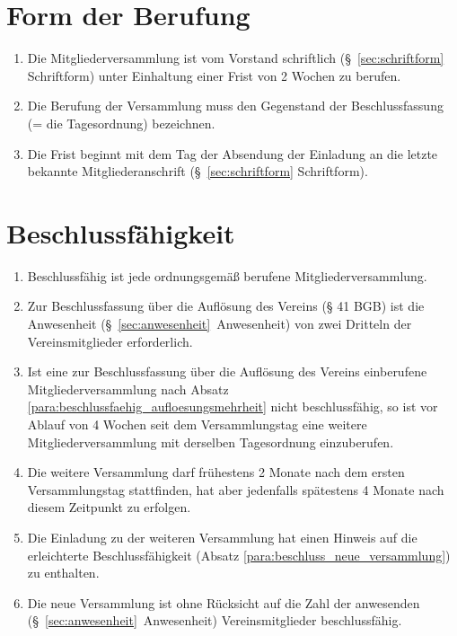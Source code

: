 \documentclass[a4paper]{article}
\begin{document}
\section{Form der Berufung}\label{sec:form_der_berufung}

\begin{enumerate}
\item Die Mitgliederversammlung ist vom Vorstand schriftlich (§~\ref{sec:schriftform} Schriftform) unter Einhaltung einer Frist von 2 Wochen zu berufen.
\item Die Berufung der Versammlung muss den Gegenstand der Beschlussfassung (= die Tagesordnung) bezeichnen.
\item Die Frist beginnt mit dem Tag der Absendung der Einladung an die letzte bekannte Mitgliederanschrift (§~\ref{sec:schriftform} Schriftform).
\end{enumerate}


\section{Beschlussfähigkeit}\label{sec:beschlussfaehigkeit}

\begin{enumerate}
\item Beschlussfähig ist jede ordnungsgemäß berufene Mitgliederversammlung.\label{para:beschlussfaehig_ordnungsgemaess}
\item Zur Beschlussfassung über die Auflösung des Vereins (§ 41 BGB) ist die Anwesenheit (§~\ref{sec:anwesenheit}~Anwesenheit) von zwei Dritteln der Vereinsmitglieder erforderlich.\label{para:beschlussfaehig_aufloesungsmehrheit}
\item Ist eine zur Beschlussfassung über die Auflösung des Vereins einberufene Mitgliederversammlung nach Absatz \ref{para:beschlussfaehig_aufloesungsmehrheit} nicht beschlussfähig, so ist vor Ablauf von 4 Wochen seit dem Versammlungstag eine weitere Mitgliederversammlung mit derselben Tagesordnung einzuberufen.\label{para:beschlussfaehig_alternative_mv}
\item Die weitere Versammlung darf frühestens 2 Monate nach dem ersten Versammlungstag stattfinden, hat aber jedenfalls spätestens 4 Monate nach diesem Zeitpunkt zu erfolgen.
\item Die Einladung zu der weiteren Versammlung hat einen Hinweis auf die erleichterte Beschlussfähigkeit (Absatz \ref{para:beschluss_neue_versammlung}) zu enthalten.
\item Die neue Versammlung ist ohne Rücksicht auf die Zahl der anwesenden (§~\ref{sec:anwesenheit}~Anwesenheit) Vereinsmitglieder beschlussfähig.\label{para:beschluss_neue_versammlung}
\end{enumerate}
\end{document}
